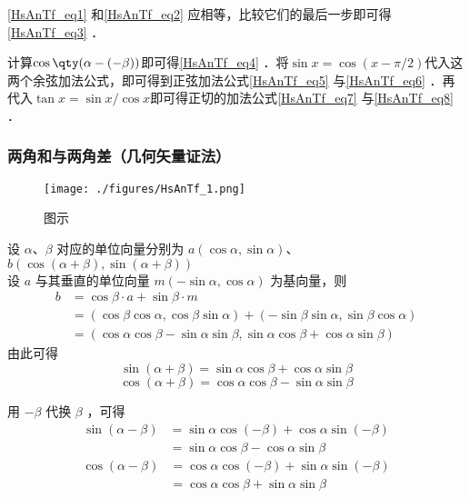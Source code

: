 \autoref{HsAnTf_eq1} 和\autoref{HsAnTf_eq2} 应相等，比较它们的最后一步即可得\autoref{HsAnTf_eq3} ．

计算$\cos\qty(\alpha-(-\beta))$即可得\autoref{HsAnTf_eq4} ．将$\sin x=\cos(x-\pi/2)$代入这两个余弦加法公式，即可得到正弦加法公式\autoref{HsAnTf_eq5} 与\autoref{HsAnTf_eq6} ．再代入$\tan x=\sin x/\cos x$即可得正切的加法公式\autoref{HsAnTf_eq7} 与\autoref{HsAnTf_eq8} ．



\subsubsection{两角和与两角差（几何矢量证法）}
\begin{figure}[ht]
\centering
\texttt{[image: ./figures/HsAnTf\_1.png]}
\caption{图示} \label{HsAnTf_fig1}
\end{figure}
设 $\alpha$、$\beta$ 对应的单位向量分别为 $a(\cos\alpha,\sin\alpha)$、$b(\cos(\alpha+\beta),\sin(\alpha+\beta))$\\
设 $a$ 与其垂直的单位向量 $m(-\sin\alpha,\cos\alpha)$ 为基向量，则
\begin{equation}
\begin{aligned}
b &= \cos\beta \cdot a + \sin\beta \cdot m \\
&= (\cos\beta \cos\alpha,\cos\beta \sin\alpha) + (-\sin\beta \sin\alpha,\sin\beta \cos\alpha) \\
&= (\cos\alpha \cos\beta-\sin\alpha \sin\beta,\sin\alpha \cos\beta + \cos\alpha \sin\beta)
\end{aligned}
\end{equation}
由此可得
\begin{equation}
\sin(\alpha+\beta) = \sin\alpha \cos\beta + \cos\alpha \sin\beta
\end{equation}
\begin{equation}
\cos(\alpha+\beta) = \cos\alpha \cos\beta - \sin\alpha \sin\beta
\end{equation}

用 $-\beta$ 代换 $\beta$ ，可得
\begin{equation}
\begin{aligned}
\sin(\alpha-\beta) &= \sin\alpha \cos(-\beta) + \cos\alpha \sin(-\beta)\\
&=\sin\alpha \cos\beta - \cos\alpha \sin\beta
\end{aligned}
\end{equation}
\begin{equation}
\begin{aligned}
\cos(\alpha-\beta) &= \cos\alpha \cos(-\beta) + \sin\alpha \sin(-\beta)\\
&=\cos\alpha \cos\beta + \sin\alpha \sin\beta
\end{aligned}
\end{equation}

